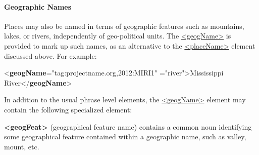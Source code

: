 \paragraph[{Geographic Names}]{Geographic Names}\label{NDPLGF}\par
Places may also be named in terms of geographic features such as mountains, lakes, or rivers, independently of geo-political units. The \hyperref[TEI.geogName]{<geogName>} is provided to mark up such names, as an alternative to the \hyperref[TEI.placeName]{<placeName>} element discussed above. For example: \par\bgroup{}\exampleFont \begin{shaded}\noindent\mbox{}{<\textbf{geogName}\hspace*{1em}{ref}="{tag:projectname.org,2012:MIRI1}"\mbox{}\newline 
\hspace*{1em}{type}="{river}">}Mississippi River{</\textbf{geogName}>}\end{shaded}\egroup\par \par
In addition to the usual phrase level elements, the \hyperref[TEI.geogName]{<geogName>} element may contain the following specialized element: 
\begin{sansreflist}
  
\item [\textbf{<geogFeat>}] (geographical feature name) contains a common noun identifying some geographical feature contained within a geographic name, such as valley, mount, etc.
\end{sansreflist}
\par

